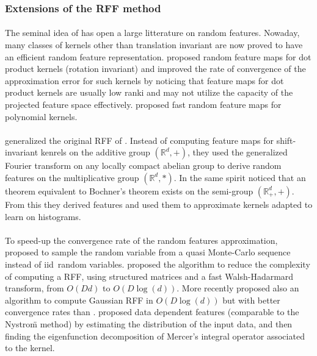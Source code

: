 \begin{Proposition}
\subsubsection{Extensions of the RFF method}
\paragraph{}
The seminal idea of \citet{Rahimi2007} has open a large litterature on random
features. Nowaday, many classes of kernels other than translation invariant are
now proved to have an efficient random feature representation.
\citet{kar2012random} proposed random feature maps for dot product kernels
(rotation invariant) and \citet{hamid2014compact} improved the rate of
convergence of the approximation error for such kernels by noticing that
feature maps for dot product kernels are usually low ranki and may not utilize
the capacity of the projected feature  space  effectively. 
proposed fast random feature maps for polynomial kernels.
\paragraph{}
 generalized the original \acs{RFF} of \citet{Rahimi2007}.
Instead of computing feature maps for shift-invariant kenrels on the additive
group $(\mathbb{R}^d, +)$, they used the generalized Fourier transform on any
locally compact abelian group to derive random features on the multiplicative
group $(\mathbb{R}^d, *)$. In the same spirit \citet{yang2014random} noticed
that an theorem equivalent to Bochner's theorem exists on the semi-group
$(\mathbb{R}_+^d, +)$. From this they derived  features and
used them to approximate kernels adapted to learn on histograms.
\paragraph{}
To speed-up the convergence rate of the random features approximation,
\citet{yang2014quasi} proposed to sample the random variable from a quasi
Monte-Carlo sequence instead of \acs{iid}~random variables. 
proposed the  algorithm to reduce the complexity of computing a
\acs{RFF}, using structured matrices and a fast Walsh-Hadarmard transform, from
$O(Dd)$ to $O(D\log(d))$. More recently \citet{felix2016orthogonal} proposed
also an algorithm  to compute Gaussian \acs{RFF} in $O(D\log(d))$ but
with better convergence rates than  \citep{Le2013}.
 proposed data dependent features (comparable to the
Nystro\"m method) by estimating the distribution of the input data, and then
finding the eigenfunction decomposition of Mercer's integral operator
associated to the kernel.

\end{Proposition}
